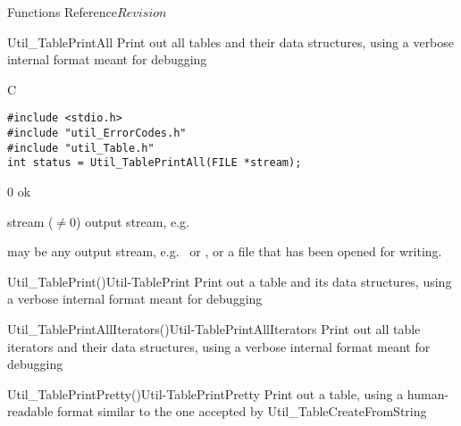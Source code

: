 \begin{cactuspart}{ Functions Reference}{}{$Revision$}
\begin{FunctionDescription}{Util\_TablePrintAll}
\label{Util-TablePrintAll}
Print out all tables and their data structures, using a verbose
internal format meant for debugging

\begin{SynopsisSection}
\begin{Synopsis}{C}
\begin{verbatim}
#include <stdio.h>
#include "util_ErrorCodes.h"
#include "util_Table.h"
int status = Util_TablePrintAll(FILE *stream);
\end{verbatim}
\end{Synopsis}
\end{SynopsisSection}

\begin{ResultSection}
\begin{Result}{\rm 0}
ok
\end{Result}
\end{ResultSection}

\begin{ParameterSection}
\begin{Parameter}{stream ($\ne 0$)}
output stream, e.g.\ 
\end{Parameter}
\end{ParameterSection}

\begin{Discussion}
 may be any output stream, e.g.\  or
, or a file that has been opened for writing.
\end{Discussion}

\begin{SeeAlsoSection}
\begin{SeeAlso2}{Util\_TablePrint()}{Util-TablePrint}
Print out a table and its data structures, using a verbose internal
format meant for debugging
\end{SeeAlso2}
\begin{SeeAlso2}{Util\_TablePrintAllIterators()}{Util-TablePrintAllIterators}
Print out all table iterators and their data structures, using a
verbose internal format meant for debugging
\end{SeeAlso2}
\begin{SeeAlso2}{Util\_TablePrintPretty()}{Util-TablePrintPretty}
Print out a table, using a human-readable format similar to the one
accepted by Util\_TableCreateFromString
\end{SeeAlso2}
\end{SeeAlsoSection}


\end{FunctionDescription}
\end{cactuspart}
